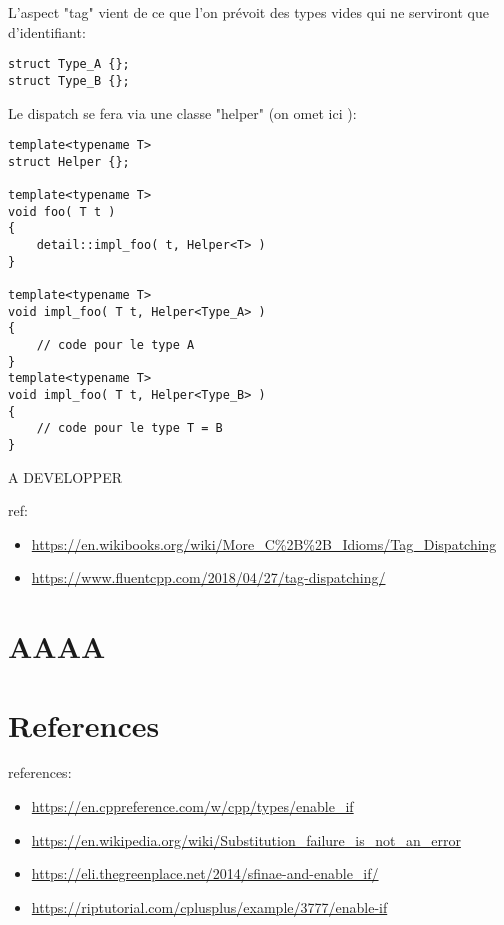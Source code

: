 \documentclass[11pt,a4paper]{article}
\begin{document}
L'aspect "tag" vient de ce que l'on prévoit des types vides qui ne serviront que d'identifiant:
\begin{lstlisting}
struct Type_A {};
struct Type_B {};
\end{lstlisting}

Le dispatch se fera via une classe "helper" (on omet ici ):
\begin{lstlisting}
template<typename T>
struct Helper {};

template<typename T>
void foo( T t )
{
	detail::impl_foo( t, Helper<T> )
}

template<typename T>
void impl_foo( T t, Helper<Type_A> )
{
	// code pour le type A
}
template<typename T>
void impl_foo( T t, Helper<Type_B> )
{
	// code pour le type T = B
}
\end{lstlisting}




A DEVELOPPER

ref:
\begin{itemize}
\item \url{https://en.wikibooks.org/wiki/More_C%2B%2B_Idioms/Tag_Dispatching}
\item \url{https://www.fluentcpp.com/2018/04/27/tag-dispatching/}
\end{itemize}

\section{AAAA}

\section{References}


references:
\begin{itemize}
\item \url{https://en.cppreference.com/w/cpp/types/enable_if}
\item \url{https://en.wikipedia.org/wiki/Substitution_failure_is_not_an_error}
\item \url{https://eli.thegreenplace.net/2014/sfinae-and-enable_if/}
\item \url{https://riptutorial.com/cplusplus/example/3777/enable-if}
\end{itemize}
\end{document}
